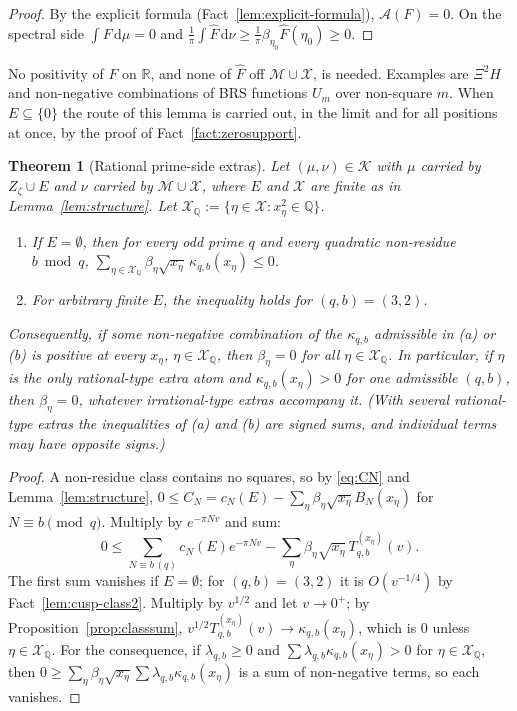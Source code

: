 \documentclass[11pt]{amsart}
\newcommand{\RR}{\mathbb R}
\newcommand{\QQ}{\mathbb Q}
\newcommand{\dd}{\,\mathrm d}
\newcommand{\hF}{\widehat F}
\newcommand{\BRS}{\mathcal M}
\newcommand{\Zz}{Z_\zeta}
\newcommand{\Arch}{\mathcal A}
\newcommand{\Kad}{\mathcal K}
\newtheorem{theorem}{Theorem}[section]
\theoremstyle{definition}
\theoremstyle{remark}
\numberwithin{equation}{section}
\begin{document}
\begin{proof}
By the explicit formula (Fact~\ref{lem:explicit-formula}), $\Arch(F)=0$. On the spectral side $\int F\dd\mu=0$ and
$\frac1\pi\int\hF\dd\nu\ge\frac1\pi\beta_{\eta_0}\hF(\eta_0)\ge0$.
\end{proof}

No positivity of $F$ on $\RR$, and none of $\hF$ off $\BRS\cup\mathcal X$, is needed. Examples are $\Xi^2H$ and non-negative
combinations of BRS functions $U_m$ over non-square $m$. When $E\subseteq\{0\}$ the route of this lemma is carried out, in the limit and
for all positions at once, by the proof of Fact~\ref{fact:zerosupport}.

\begin{theorem}[Rational prime-side extras]\label{thm:extra-primes}
Let $(\mu,\nu)\in\Kad$ with $\mu$ carried by $\Zz\cup E$ and $\nu$ carried by $\BRS\cup\mathcal X$, where $E$ and $\mathcal X$ are finite as
in Lemma~\ref{lem:structure}. Let $\mathcal X_\QQ:=\{\eta\in\mathcal X:x_\eta^2\in\QQ\}$.
\begin{enumerate}[label=\textup{(\alph*)}]
\item If $E=\emptyset$, then for every odd prime $q$ and every quadratic non-residue $b\bmod q$,
$\sum_{\eta\in\mathcal X_\QQ}\beta_\eta\sqrt{x_\eta}\,\kappa_{q,b}(x_\eta)\le0$.
\item For arbitrary finite $E$, the inequality holds for $(q,b)=(3,2)$.
\end{enumerate}
Consequently, if some non-negative combination of the $\kappa_{q,b}$ admissible in \textup{(a)} or \textup{(b)} is positive at every
$x_\eta$, $\eta\in\mathcal X_\QQ$, then $\beta_\eta=0$ for all $\eta\in\mathcal X_\QQ$. In particular, if $\eta$ is the only rational-type extra atom and
$\kappa_{q,b}(x_\eta)>0$ for one admissible $(q,b)$, then $\beta_\eta=0$, whatever irrational-type extras accompany it. (With
several rational-type extras the inequalities of (a) and (b) are signed sums, and individual terms may have opposite signs.)
\end{theorem}

\begin{proof}
A non-residue class contains no squares, so by \eqref{eq:CN} and Lemma~\ref{lem:structure},
$0\le C_N=c_N(E)-\sum_\eta\beta_\eta\sqrt{x_\eta}B_N(x_\eta)$ for $N\equiv b\pmod q$. Multiply by $e^{-\pi Nv}$ and sum:
\[
0\le\sum_{N\equiv b\,(q)}c_N(E)e^{-\pi Nv}-\sum_\eta\beta_\eta\sqrt{x_\eta}\,T^{(x_\eta)}_{q,b}(v).
\]
The first sum vanishes if $E=\emptyset$; for $(q,b)=(3,2)$ it is $O(v^{-1/4})$ by Fact~\ref{lem:cusp-class2}. Multiply by
$v^{1/2}$ and let $v\to0^+$; by Proposition~\ref{prop:classsum}, $v^{1/2}T^{(x_\eta)}_{q,b}(v)\to\kappa_{q,b}(x_\eta)$, which is $0$ unless
$\eta\in\mathcal X_\QQ$. For the consequence, if $\lambda_{q,b}\ge0$ and $\sum\lambda_{q,b}\kappa_{q,b}(x_\eta)>0$ for $\eta\in\mathcal X_\QQ$, then
$0\ge\sum_\eta\beta_\eta\sqrt{x_\eta}\sum\lambda_{q,b}\kappa_{q,b}(x_\eta)$ is a sum of non-negative terms, so each vanishes.
\end{proof}
\end{document}
